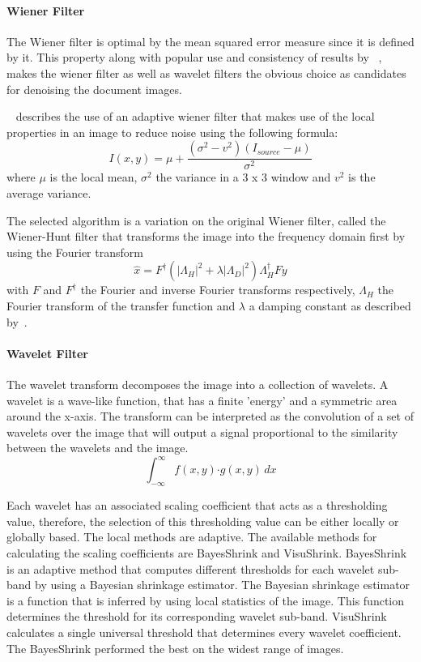 \documentclass[a4paper, 12pt]{report}
\begin{document}
\paragraph{Wiener Filter}
The Wiener filter is optimal by the mean squared error measure since it is
defined by it. This property along with popular use and consistency of results
by ~\cite{6524379}, ~\cite{gatos2006adaptive} makes the wiener filter as well
as wavelet filters the obvious choice as candidates for denoising the document
images.
\par
~\cite{gatos2006adaptive} describes the use of an adaptive wiener filter that makes use of the local properties in an image to reduce noise using the following formula:
\[I(x,y)=\mu+\frac{(\sigma^2-v^2)(I_{source}-\mu)}{\sigma^2}\]
where \(\mu\) is the local mean, \(\sigma^2\) the variance in a 3 x 3 window
and \(v^2\) is the average variance.
\par
The selected algorithm is a variation on the original Wiener filter, called the
Wiener-Hunt filter that transforms the image into the frequency domain first by
using the Fourier transform
\[\hat x = F^\dagger (|\Lambda_H|^2 + \lambda |\Lambda_D|^2)
    \Lambda_H^\dagger F y\]
with \(F\) and \(F^\dagger\) the Fourier and inverse Fourier transforms
respectively, \(\Lambda_H\) the Fourier transform of the transfer function and
\(\lambda\) a damping constant as described by~\cite{scikit-image}.

\paragraph{Wavelet Filter}
The wavelet transform decomposes the image into a collection of wavelets. A
wavelet is a wave-like function, that has a finite 'energy' and a symmetric
area around the x-axis. The transform can be interpreted as the convolution of
a set of wavelets over the image that will output a signal proportional to the
similarity between the wavelets and the image.
\[ \int_{-\infty}^{\infty} f(x,y) \mathbf{\cdot} g(x,y) \,dx \]

Each wavelet has an associated scaling coefficient that acts as a thresholding
value, therefore, the selection of this thresholding value can be either
locally or globally based. The local methods are adaptive. The available
methods for calculating the scaling coefficients are BayesShrink and
VisuShrink. BayesShrink is an adaptive method that computes different
thresholds for each wavelet sub-band by using a Bayesian shrinkage estimator.
The Bayesian shrinkage estimator is a function that is inferred by using local
statistics of the image. This function determines the threshold for its
corresponding wavelet sub-band. VisuShrink calculates a single universal
threshold that determines every wavelet coefficient. The BayesShrink performed
the best on the widest range of images.\par
\end{document}
